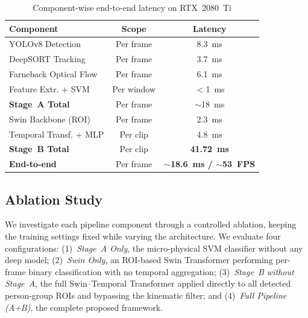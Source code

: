 \documentclass[conference]{IEEEtran}
\begin{document}
\begin{table}[!htbp]
\centering
\footnotesize
\caption{Component-wise end-to-end latency on RTX~2080~Ti}
\label{tab:latency}
\begin{tabular}{lcc}
\hline
\textbf{Component} & \textbf{Scope} & \textbf{Latency} \\
\hline
YOLOv8 Detection            & Per frame   & 8.3~ms \\
DeepSORT Tracking           & Per frame   & 3.7~ms \\
Farneback Optical Flow      & Per frame   & 6.1~ms \\
Feature Extr. + SVM         & Per window  & $<$1~ms \\
\textbf{Stage~A Total}      & Per frame   & $\sim$18~ms \\
\hline
Swin Backbone (ROI)         & Per frame   & 2.3~ms \\
Temporal Transf. + MLP      & Per clip    & 4.8~ms \\
\textbf{Stage~B Total}      & Per clip    & \textbf{41.72~ms} \\
\hline
\textbf{End-to-end} & Per frame & \textbf{$\sim$18.6~ms / $\sim$53~FPS} \\
\hline
\end{tabular}
\end{table}


\subsection{Ablation Study}

We investigate each pipeline component through a controlled ablation, keeping the training settings fixed while varying the architecture. We evaluate four configurations: (1)~\textit{Stage~A Only}, the micro-physical SVM classifier without any deep model; (2)~\textit{Swin Only}, an ROI-based Swin Transformer performing per-frame binary classification with no temporal aggregation; (3)~\textit{Stage~B without Stage~A}, the full Swin--Temporal Transformer applied directly to all detected person-group ROIs and bypassing the kinematic filter; and (4)~\textit{Full Pipeline (A+B)}, the complete proposed framework.
\end{document}
